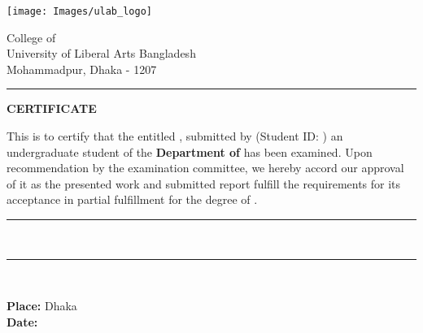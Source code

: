 \thispagestyle{plain}
\noindent
\begin{minipage}{0.37\textwidth}
\texttt{[image: Images/ulab\_logo]}
\end{minipage}
\begin{minipage}{0.63\textwidth}

 College of \College  \\
 University of Liberal Arts Bangladesh \\
 Mohammadpur, Dhaka - 1207
\end{minipage}

\vspace{0.5\baselineskip}
\hrule
\vspace{2\baselineskip}

\begin{center}
{\Large {\bf \uppercase{Certificate}}}
\end{center}

\vspace{\baselineskip}

\noindent This is to certify that the \MakeTextLowercase{\RoportType} entitled {\bf \ReportTitle}, submitted by {\bf \firstAuthor} (Student ID: {\firstAuthorID}) an undergraduate student of the {\bf Department of \College } has been examined. Upon recommendation by the examination committee, we hereby accord our approval of it as the presented work and submitted report fulfill the requirements for its acceptance in partial fulfillment for the degree of \emph{\Degree}. 

\vspace{3\baselineskip}
\begin{flushright}
\begin{minipage}[c]{0.63\textwidth}
\centering
\hrule 
\vspace{0.5\baselineskip}
{\bf \Supervisor \\ \SupervisorPosition} \par
{}
\end{minipage}
\end{flushright}
\vspace{2\baselineskip}
\begin{flushright}
\begin{minipage}[c]{0.63\textwidth}
\centering
\hrule 
\vspace{0.5\baselineskip}
{\bf \HodName\\ \HodPosition} \par
{}
\end{minipage}
\end{flushright}
\vspace{\baselineskip}

\noindent
{\bf Place:} Dhaka \\
{\bf Date:} \reportSubmissionDate